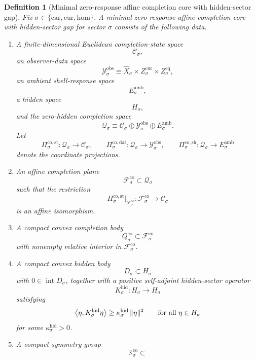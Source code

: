 \documentclass[11pt]{article}
\newcommand{\Car}{\mathrm{car}}
\newcommand{\Cur}{\mathrm{cur}}
\newcommand{\Hom}{\mathrm{hom}}
\newcommand{\VisibleAffine}[1]{\widehat X_{#1}}
\newcommand{\DataSpace}[1]{\mathcal Y_{#1}^{\mathrm{obs}}}
\newcommand{\AmbientTarget}[1]{E_{#1}^{\mathrm{amb}}}
\newcommand{\CoreState}[1]{\mathcal C_{#1}}
\newcommand{\CoreSpace}[1]{\mathcal Q_{#1}}
\newcommand{\CoreAffine}[1]{\mathcal F_{#1}^{\mathrm{co}}}
\newcommand{\CoreBody}[1]{Q_{#1}^{\mathrm{co}}}
\newcommand{\CoreStateProj}[1]{\Pi_{#1}^{\mathrm{co,st}}}
\newcommand{\CoreDataProj}[1]{\Pi_{#1}^{\mathrm{co,dat}}}
\newcommand{\CoreShellProj}[1]{\Pi_{#1}^{\mathrm{co,sh}}}
\newcommand{\CoreSym}[1]{\mathbb K_{#1}^{\mathrm{co}}}
\newcommand{\GapSpace}[1]{H_{#1}}
\newcommand{\GapBody}[1]{D_{#1}}
\newcommand{\HiddenOperator}[1]{K_{#1}^{\mathrm{hid}}}
\newtheorem{definition}{Definition}
\begin{document}
\begin{definition}[Minimal zero-response affine completion core with hidden-sector gap]
\label{def:core}
Fix \(\sigma\in\{\Car,\Cur,\Hom\}\). A \emph{minimal zero-response affine completion core with hidden-sector gap} for sector \(\sigma\) consists of the following data.
\begin{enumerate}
    \item A finite-dimensional Euclidean completion-state space
    \[
    \CoreState{\sigma},
    \]
    an observer-data space
    \[
    \DataSpace{\sigma}
    \equiv
    \VisibleAffine{\sigma}\times Z_{\sigma}^{\mathrm{cur}}\times Z_{\sigma}^{\mathrm{eq}},
    \]
    an ambient shell-response space
    \[
    \AmbientTarget{\sigma},
    \]
    a hidden space
    \[
    \GapSpace{\sigma},
    \]
    and the zero-hidden completion space
    \[
    \CoreSpace{\sigma}
    \equiv
    \CoreState{\sigma}\oplus\DataSpace{\sigma}\oplus\AmbientTarget{\sigma}.
    \]
    Let
    \[
    \CoreStateProj{\sigma}:\CoreSpace{\sigma}\to \CoreState{\sigma},
    \qquad
    \CoreDataProj{\sigma}:\CoreSpace{\sigma}\to \DataSpace{\sigma},
    \qquad
    \CoreShellProj{\sigma}:\CoreSpace{\sigma}\to \AmbientTarget{\sigma}
    \]
    denote the coordinate projections.
    \item An affine completion plane
    \[
    \CoreAffine{\sigma}\subset\CoreSpace{\sigma}
    \]
    such that the restriction
    \[
    \CoreStateProj{\sigma}\big|_{\CoreAffine{\sigma}}:
    \CoreAffine{\sigma}\to\CoreState{\sigma}
    \]
    is an affine isomorphism.
    \item A compact convex completion body
    \[
    \CoreBody{\sigma}\subset\CoreAffine{\sigma}
    \]
    with nonempty relative interior in \(\CoreAffine{\sigma}\).
    \item A compact convex hidden body
    \[
    \GapBody{\sigma}\subset\GapSpace{\sigma}
    \]
    with \(0\in\operatorname{int}\GapBody{\sigma}\), together with a positive self-adjoint hidden-sector operator
    \[
    \HiddenOperator{\sigma}:\GapSpace{\sigma}\to\GapSpace{\sigma}
    \]
    satisfying
    \begin{equation}
    \ev{\eta,\HiddenOperator{\sigma}\eta}
    \ge
    \kappa_{\sigma}^{\mathrm{hid}}\,
    \|\eta\|^{2}
    \qquad
    \text{for all }\eta\in\GapSpace{\sigma}
    \label{eq:coregap}
    \end{equation}
    for some \(\kappa_{\sigma}^{\mathrm{hid}}>0\).
    \item A compact symmetry group
    \[
    \CoreSym{\sigma}\subset
\]
\end{enumerate}
\end{definition}
\end{document}
